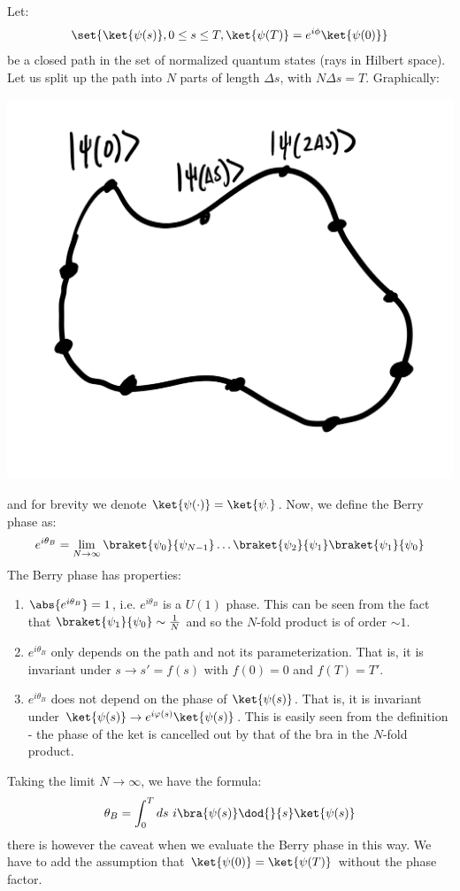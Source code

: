 Let:
\begin{equation}
    \set{\ket{\psi(s)}, 0 \leq s \leq T, \ket{\psi(T)} = e^{i\phi}\ket{\psi(0)}}
\end{equation}
be a closed path in the set of normalized quantum states (rays in Hilbert space). Let us split up the path into $N$ parts of length $\Delta s$, with $N\Delta s = T$. Graphically:

\begin{center}
    \includegraphics[scale=0.3]{Lectures/Images/lec3-berryphasepath.png}
\end{center}

and for brevity we denote $\ket{\psi(\cdot)} = \ket{\psi_\cdot}$. Now, we define the Berry phase as:
\begin{equation}
    e^{i\theta_B} = \lim_{N \to \infty}\braket{\psi_0}{\psi_{N-1}}\ldots\braket{\psi_2}{\psi_1}\braket{\psi_1}{\psi_0}
\end{equation}
The Berry phase has properties:
\begin{enumerate}
    \item $\abs{e^{i\theta_B}} = 1$, i.e. $e^{i\theta_B}$ is a $U(1)$ phase. This can be seen from the fact that $\braket{\psi_1}{\psi_0} \sim \frac{1}{N}$ and so the $N$-fold product is of order $\sim 1$.
    \item $e^{i\theta_B}$ only depends on the path and not its parameterization. That is, it is invariant under $s \to s' = f(s)$ with $f(0) = 0$ and $f(T) = T'$.
    \item $e^{i\theta_B}$ does not depend on the phase of $\ket{\psi(s)}$. That is, it is invariant under $\ket{\psi(s)} \to e^{i\varphi(s)}\ket{\psi(s)}$. This is easily seen from the definition - the phase of the ket is cancelled out by that of the bra in the $N$-fold product.
\end{enumerate}
Taking the limit $N \to \infty$, we have the formula:
\begin{equation}
    \theta_B = \int_0^T ds\phantom{i} i\bra{\psi(s)}\dod{}{s}\ket{\psi(s)}
\end{equation}
there is however the caveat when we evaluate the Berry phase in this way. We have to add the assumption that $\ket{\psi(0)} = \ket{\psi(T)}$ without the phase factor.


